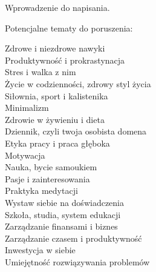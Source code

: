 Wprowadzenie do napisania.

\vin Potencjalne tematy do poruszenia:

Zdrowe i niezdrowe nawyki \\
Produktywność i prokrastynacja \\
Stres i walka z nim \\
Życie w codzienności, zdrowy styl życia \\
Siłownia, sport i kalistenika \\
Minimalizm \\
Zdrowie w żywieniu i dieta \\
Dziennik, czyli twoja osobista domena \\
Etyka pracy i praca głęboka \\
Motywacja \\
Nauka, bycie samoukiem \\
Pasje i zainteresowania \\
Praktyka medytacji \\
Wystaw siebie na doświadczenia \\
Szkoła, studia, system edukacji \\
Zarządzanie finansami i biznes \\
Zarządzanie czasem i produktywność \\
Inwestycja w siebie \\
Umiejętność rozwiązywania problemów
